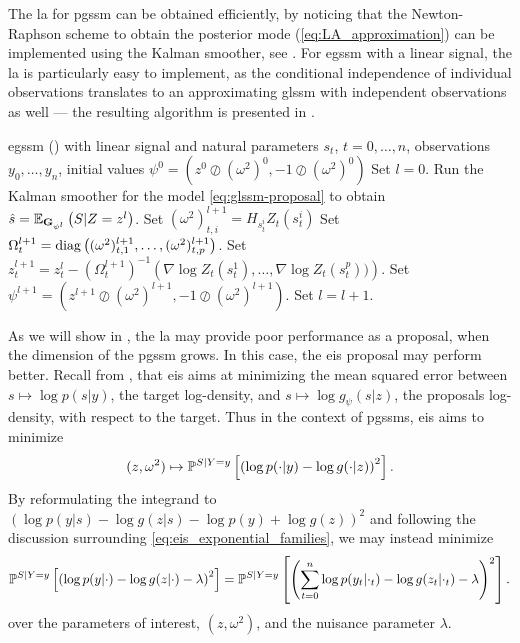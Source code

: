 The \gls{la} for \gls{pgssm} can be obtained efficiently, by noticing that the Newton-Raphson scheme to obtain the posterior mode (\eqref{eq:LA_approximation}) can be implemented using the Kalman smoother, see \citep[Chapter 10]{Durbin2012Time}. For \gls{egssm} with a linear signal, the \gls{la} is particularly easy to implement, as the conditional independence of individual observations translates to an approximating \gls{glssm} with independent observations as well ---  the resulting algorithm is presented in .

\begin{algorithm}
    \caption{The \gls{la} for \gls{egssm}}
    \label{alg:la}
    \begin{algorithmic}[1]
        \Require \gls{egssm} () with linear signal and natural parameters $s_{t}$, $t = 0, \dots, n$, observations $y_{0}, \dots, y_{n}$, initial values $\psi^{0} = \left( z^{0} \oslash (\omega^{2})^{0}, - 1\oslash (\omega^{2})^{0} \right)$
        \State Set $l = 0$.
        \Repeat
            \State Run the Kalman smoother  for the model \eqref{eq:glssm-proposal} to obtain $\hat s = \mathbb E_{\mathbf G_{\psi^{l}}} \left( S | Z = z^{l} \right)$.
                \State Set $(\omega^{2})^{l+1}_{t,i} = H_{s_{t}^{i}} Z_{t} (s_{t}^i)$ 
                \State Set $\Omega^{l + 1}_t = \operatorname{diag} \left( (\omega^{2})^{l + 1}_{t, 1}, \dots, (\omega^{2})^{l+1}_{t, p}\right)$. 
                \State Set $z_{t}^{l + 1} = z_{t}^{l} - (\Omega^{l + 1}_{t})^{-1} \left( \nabla \log Z_{t}(s_{t}^{1}), \dots, \nabla \log Z_{t}(s_{t}^p)) \right)$.  
            \EndFor
            \State Set $\psi^{l + 1} = \left( z^{l + 1} \oslash (\omega^{2})^{l + 1}, -1 \oslash (\omega^{2})^{l + 1}\right)$.
            \State Set $l = l +1$.
        
    \end{algorithmic}
\end{algorithm}

As we will show in , the \gls{la} may provide poor performance as a proposal, when the dimension of the \gls{pgssm} grows. In this case, the \gls{eis} proposal may perform better. Recall from , that \gls{eis} aims at minimizing the mean squared error between $s \mapsto \log p(s|y)$, the target log-density, and $s\mapsto\log g_{\psi}(s|z)$, the proposals log-density, with respect to the target. Thus in the context of \glspl{pgssm}, \gls{eis} aims to minimize
$$
(z, \omega^{2}) \mapsto {\ensuremath{\mathbb P^{S| Y=y}}}\left[\left( \log p(\cdot|y) - \log g(\cdot|z)\right)^{2}\right].
$$
By reformulating the integrand to $\left(\log p(y|s) - \log g(z|s) -  \log p(y)  + \log g(z)\right)^{2}$ and following the discussion surrounding \eqref{eq:eis_exponential_families}, we may instead minimize
$$
    {\mathbb P^{S| Y=y}} \left[\left( \log p(y|\cdot) - \log g(z|\cdot) - \lambda \right)^{2}\right] = {\mathbb P^{S| Y=y}} \left[ \left(\sum_{t = 0}^n \log p(y_{t}|\cdot_{t}) - \log g(z_{t}|\cdot_{t})  - \lambda \right)^{2} \right].
$$
over the parameters of interest, $(z, \omega^{2})$, and the nuisance parameter $\lambda$.

